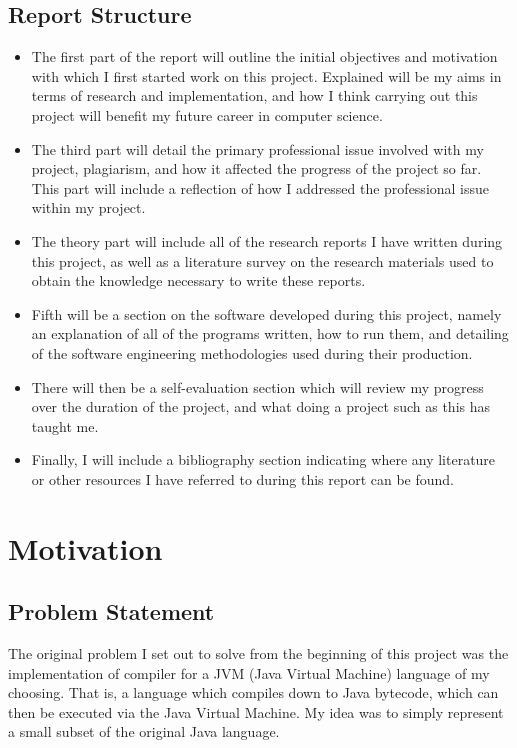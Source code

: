 \documentclass[a4paper, 11pt]{article}
\begin{document}
\subsection{Report Structure}
\begin{itemize}
\item{The first part of the report will outline the initial objectives and motivation with which I first started work on this project. Explained will be my aims in terms of research and implementation, and how I think carrying out this project will benefit my future career in computer science.}

\item{The third part will detail the primary professional issue involved with my project, plagiarism, and how it affected the progress of the project so far. This part will include a reflection of how I addressed the professional issue within my project.}

\item{The theory part will include all of the research reports I have written during this project, as well as a literature survey on the research materials used to obtain the knowledge necessary to write these reports.}

\item{Fifth will be a section on the software developed during this project, namely an explanation of all of the programs written, how to run them, and detailing of the software engineering methodologies used during their production.}

\item{There will then be a self-evaluation section which will review my progress over the duration of the project, and what doing a project such as this has taught me.}

\item{Finally, I will include a bibliography section indicating where any literature or other resources I have referred to during this report can be found.}

\end{itemize}

\newpage\section{Motivation}
\subsection{Problem Statement}
The original problem I set out to solve from the beginning of this project was the implementation of compiler for a JVM (Java Virtual Machine) language of my choosing. That is, a language which compiles down to Java bytecode, which can then be executed via the Java Virtual Machine. My idea was to simply represent a small subset of the original Java language.
\end{document}
